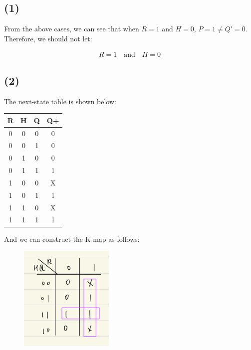 \documentclass{article}
\begin{document}
\subsection*{(1)}

From the above cases, we can see that when $R = 1$ and $H = 0$, $P = 1 \neq Q' = 0$.
Therefore, we should not let:

\begin{align*}
    R = 1 \quad \text{and} \quad H = 0
\end{align*}

\subsection*{(2)}

The next-state table is shown below:

\begin{center}
    \begin{tabular}{ |c|c|c||c| } 
        \hline
        \cline{1-4}
        R & H & Q & Q+ \\ 
        \hline
        0 & 0 & 0 & 0 \\ 
        0 & 0 & 1 & 0 \\ 
        0 & 1 & 0 & 0 \\ 
        0 & 1 & 1 & 1 \\ 
        1 & 0 & 0 & X \\
        1 & 0 & 1 & 1 \\ 
        1 & 1 & 0 & X \\ 
        1 & 1 & 1 & 1 \\ 
        \hline
    \end{tabular}
\end{center}

And we can construct the K-map as follows:

\begin{figure}[H]
    \centering
    \includegraphics[width=0.4\textwidth]{3_kmap.jpeg}
\end{figure}
\end{document}
